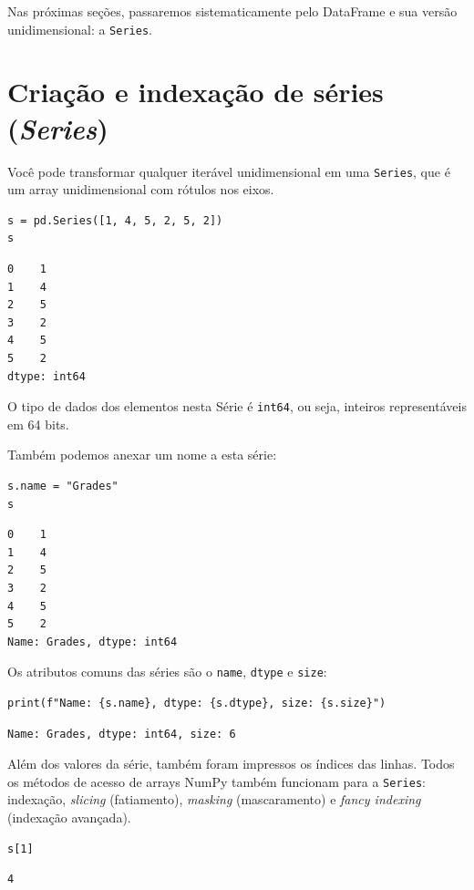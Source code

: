 \documentclass[11pt,a4paper]{article}
\begin{document}
Nas próximas seções, passaremos sistematicamente pelo DataFrame e sua versão unidimensional: a \texttt{Series}.

\section{Criação e indexação de séries (\textit{Series})}

Você pode transformar qualquer iterável unidimensional em uma \texttt{Series}, que é um array unidimensional com rótulos nos eixos.

\begin{lstlisting}
s = pd.Series([1, 4, 5, 2, 5, 2])
s
\end{lstlisting}

\begin{verbatim}
0    1
1    4
2    5
3    2
4    5
5    2
dtype: int64
\end{verbatim}

O tipo de dados dos elementos nesta Série é \texttt{int64}, ou seja, inteiros representáveis em 64 bits.

Também podemos anexar um nome a esta série:

\begin{lstlisting}
s.name = "Grades"
s
\end{lstlisting}

\begin{verbatim}
0    1
1    4
2    5
3    2
4    5
5    2
Name: Grades, dtype: int64
\end{verbatim}

Os atributos comuns das séries são o \texttt{name}, \texttt{dtype} e \texttt{size}:

\begin{lstlisting}
print(f"Name: {s.name}, dtype: {s.dtype}, size: {s.size}")
\end{lstlisting}

\begin{verbatim}
Name: Grades, dtype: int64, size: 6
\end{verbatim}

Além dos valores da série, também foram impressos os índices das linhas. Todos os métodos de acesso de arrays NumPy também funcionam para a \texttt{Series}: indexação, \textit{slicing} (fatiamento), \textit{masking} (mascaramento) e \textit{fancy indexing} (indexação avançada).

\begin{lstlisting}
s[1]
\end{lstlisting}
\begin{verbatim}
4
\end{verbatim}
\end{document}
